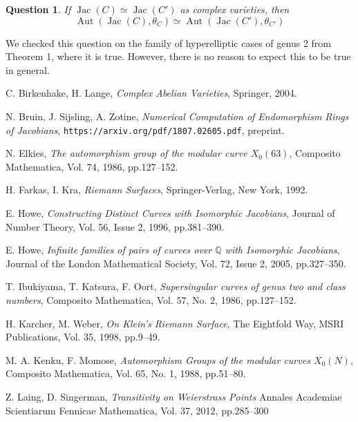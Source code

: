 \documentclass[12pt,reqno]{amsart}
\DeclareMathOperator{\Aut}{Aut}
\DeclareMathOperator{\Jac}{Jac}
\newcommand{\Q}{\mathbb{Q}}
\newcommand{\mc}{\mathcal}
\newtheorem*{question}{Question}
\theoremstyle{definition}
\theoremstyle{remark}
\begin{document}

\begin{question} If $\Jac(C) \simeq \Jac(C')$ as complex varieties, then $$\Aut(\Jac(C), \theta_C) \simeq \Aut(\Jac(C'), \theta_{C'})$$  \end{question} 

We checked this question on the family of hyperelliptic cases of genus 2 from \cite{howe1} Theorem 1, where it is true. However, there is no reason to expect this to be true in general. 

\begin{thebibliography}{20}

C. Birkenhake, H. Lange, 
\textit{Complex Abelian Varieties},
Springer, 2004.

N. Bruin, J. Sijsling, A. Zotine,
\textit{Numerical Computation of Endomorphism Rings of Jacobians},
\texttt{https://arxiv.org/pdf/1807.02605.pdf}, preprint.

N. Elkies,
\textit{The automorphism group of the modular curve $X_0(63)$},
Composito Mathematica,
Vol. 74, 1986, pp.127--152.

H. Farkas, I. Kra,
\textit{Riemann Surfaces},
Springer-Verlag, New York, 1992.

E. Howe,
\textit{Constructing Distinct Curves with Isomorphic Jacobians},
Journal of Number Theory,
Vol. 56, Issue 2, 1996, pp.381--390.

E. Howe,
\textit{Infinite families of pairs of curves over $\Q$ with Isomorphic Jacobians},
Journal of the London Mathematical Society,
Vol. 72, Issue 2, 2005, pp.327--350.

T. Ibukiyama, T. Katsura, F. Oort,
\textit{Supersingular curves of genus two and class numbers},
Composito Mathematica,
Vol. 57, No. 2, 1986, pp.127--152.

H. Karcher, M. Weber,
\textit{On Klein's Riemann Surface},
The Eightfold Way, MSRI Publications, 
Vol. 35, 1998, pp.9--49.

M. A. Kenku, F. Momose,
\textit{Automorphism Groups of the modular curves $X_0(N)$},
Composito Mathematica,
Vol. 65, No. 1, 1988, pp.51--80.

Z. Laing, D. Singerman,
\textit{Transitivity on Weierstrass Points}
Annales Academiae Scientiarum Fennicae Mathematica,
Vol. 37, 2012, pp.285--300


\end{thebibliography}
\end{document}
